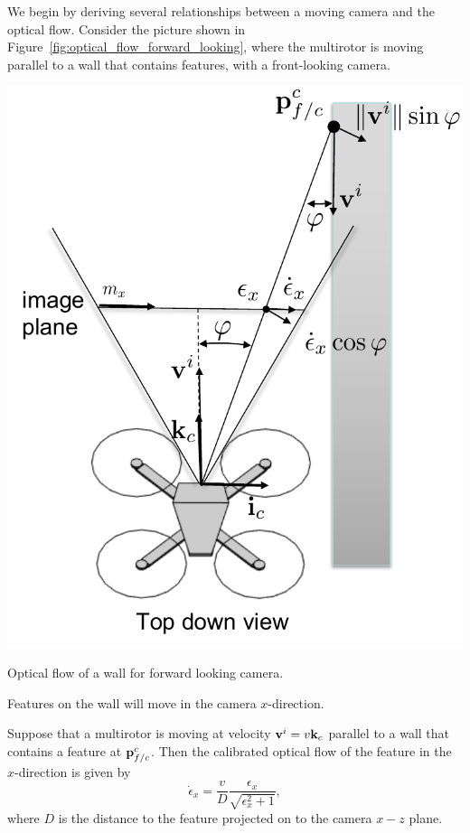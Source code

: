 We begin by deriving several relationships between a moving camera and the optical flow. 
%
Consider the picture shown in Figure~\ref{fig:optical_flow_forward_looking}, where the multirotor is moving parallel to a wall that contains features, with a front-looking camera.  
\begin{marginfigure}
	\includegraphics[width=\linewidth]{chap7_optical_flow/figures/optical_flow_forward_looking}
	\caption{Optical flow of a wall for forward looking camera.}
	\label{fig:optical_flow_forward_looking}
\end{marginfigure}
Features on the wall will move in the camera $x$-direction.
\begin{theorem}\label{thm:epsilon_x_dot_forward_looking}
	Suppose that a multirotor is moving at velocity $\mathbf{v}^i = v\mathbf{k}_c$ parallel to a wall that contains a feature at $\mathbf{p}_{f/c}^c$.  Then the calibrated optical flow of the feature in the $x$-direction is given by
	\begin{equation}\label{eq:epsilon_x_dot_forward_looking}
	\dot{\epsilon}_x = \frac{v}{D}\frac{\epsilon_x}{\sqrt{\epsilon_x^2 + 1}},
	\end{equation}
	where $D$ is the distance to the feature projected on to the camera $x-z$ plane.
\end{theorem}
